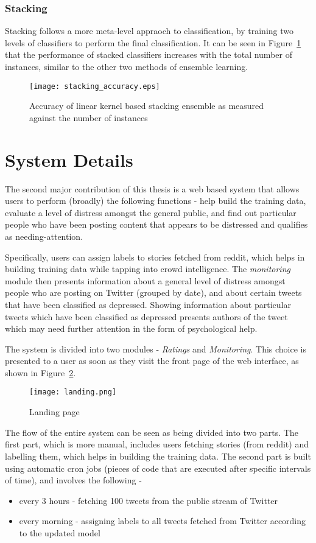 \subsubsection{Stacking}
Stacking follows a more meta-level appraoch to classification, by training two levels of classifiers to perform the final classification. It can be seen in Figure~\ref{stacking_accuracy} that the performance of stacked classifiers increases with the total number of instances, similar to the other two methods of ensemble learning.
\begin{figure}
    \centering
    \texttt{[image: stacking\_accuracy.eps]}
    \caption{Accuracy of linear kernel based stacking ensemble as measured against the number of instances}
    \label{stacking_accuracy}
\end{figure}

\section{System Details}
\label{section:system_details}

The second major contribution of this thesis is a web based system that allows users to perform (broadly) the following functions - help build the training data, evaluate a level of distress amongst the general public, and find out particular people who have been posting content that appears to be distressed and qualifies as needing-attention.

Specifically, users can assign labels to stories fetched from reddit, which helps in building training data while tapping into crowd intelligence. The \emph{monitoring} module then presents information about a general level of distress amongst people who are posting on Twitter (grouped by date), and about certain tweets that have been classified as depressed. Showing information about particular tweets which have been classified as depressed presents authors of the tweet which may need further attention in the form of psychological help.

The system is divided into two modules - \emph{Ratings} and \emph{Monitoring}. This choice is presented to a user as soon as they visit the front page of the web interface, as shown in Figure~\ref{landing}.
\begin{figure}
    \centering
    \texttt{[image: landing.png]}
    \caption{Landing page}
    \label{landing}
\end{figure}

The flow of the entire system can be seen as being divided into two parts. The first part, which is more manual, includes users fetching stories (from reddit) and labelling them, which helps in building the training data. The second part is built using automatic cron jobs (pieces of code that are executed after specific intervals of time), and involves the following -
\begin{itemize}
    \item{every 3 hours - fetching 100 tweets from the public stream of Twitter}
    \item{every morning - assigning labels to all tweets fetched from Twitter according to the updated model}
\end{itemize}

